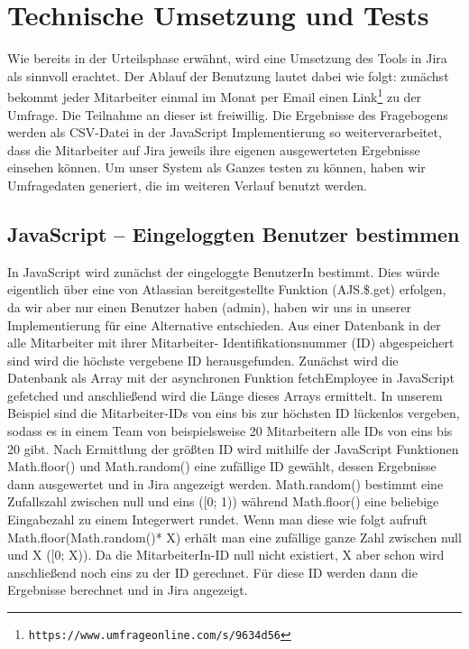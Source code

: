 \documentclass[a4paper,12pt,]{article}
\begin{document}
\section{Technische Umsetzung und Tests}
Wie bereits in der Urteilsphase erwähnt, wird eine Umsetzung des Tools in Jira als sinnvoll erachtet. Der Ablauf der Benutzung lautet dabei wie folgt: zunächst bekommt jeder Mitarbeiter einmal im Monat per Email einen Link\footnote{\tt https://www.umfrageonline.com/s/9634d56} zu der Umfrage. Die Teilnahme an dieser ist freiwillig. Die Ergebnisse des Fragebogens werden als CSV-Datei in der Java\-Script Implementierung so weiterverarbeitet, dass die Mitarbeiter auf Jira jeweils ihre eigenen ausgewerteten Ergebnisse einsehen können. Um unser System als Ganzes testen zu können, haben wir Umfragedaten generiert, die im weiteren Verlauf benutzt werden.
 
\subsection{JavaScript – Eingeloggten Benutzer bestimmen}
In JavaScript wird zunächst der eingeloggte BenutzerIn bestimmt. Dies würde eigentlich über eine von Atlassian bereitgestellte Funktion (AJS.\$.get) erfolgen, da wir aber nur einen Benutzer haben (admin), haben wir uns in unserer Implementierung für eine Alternative entschieden. Aus einer Datenbank in der alle Mitarbeiter mit ihrer Mitarbeiter- Identifikationsnummer (ID) abgespeichert sind wird die höchste vergebene ID herausgefunden. Zunächst wird die Datenbank als Array mit der asynchronen Funktion fetchEmployee in JavaScript gefetched und anschließend wird die Länge dieses Arrays ermittelt. In unserem Beispiel sind die Mitarbeiter-IDs von eins bis zur höchsten ID lückenlos vergeben, sodass es in einem Team von beispielsweise 20 Mitarbeitern alle IDs von eins bis 20 gibt. Nach Ermittlung der größten ID wird mithilfe der JavaScript Funktionen Math.floor() und Math.random() eine zufällige ID gewählt, dessen Ergebnisse dann ausgewertet und in Jira angezeigt werden. Math.random() bestimmt eine Zufallszahl zwischen null und eins ([0; 1))  während Math.floor() eine beliebige Eingabezahl zu einem Integerwert rundet. Wenn man diese wie folgt aufruft Math.floor(Math.random()* X) erhält man eine zufällige ganze Zahl zwischen null und X ([0; X)). Da die MitarbeiterIn-ID null nicht existiert, X aber schon wird anschließend noch eins zu der ID gerechnet. Für diese ID werden dann die Ergebnisse berechnet und in Jira angezeigt. 
\end{document}
